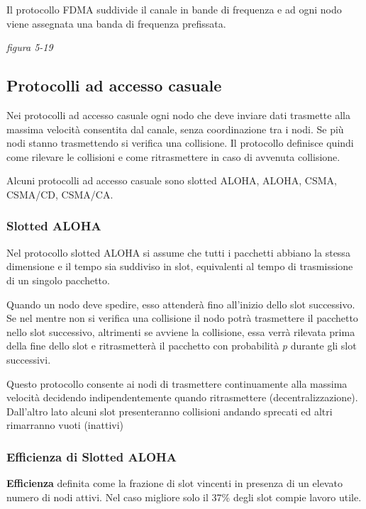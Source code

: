 \documentclass[
]{article}
\begin{document}
Il protocollo FDMA suddivide il canale in bande di frequenza e ad ogni
nodo viene assegnata una banda di frequenza prefissata.

\emph{figura 5-19}

\hypertarget{header-n64}{%
\subsection{Protocolli ad accesso casuale}\label{header-n64}}

Nei protocolli ad accesso casuale ogni nodo che deve inviare dati
trasmette alla massima velocità consentita dal canale, senza
coordinazione tra i nodi. Se più nodi stanno trasmettendo si verifica
una collisione. Il protocollo definisce quindi come rilevare le
collisioni e come ritrasmettere in caso di avvenuta collisione.

Alcuni protocolli ad accesso casuale sono slotted ALOHA, ALOHA, CSMA,
CSMA/CD, CSMA/CA.

\hypertarget{header-n67}{%
\subsubsection{Slotted ALOHA}\label{header-n67}}

Nel protocollo slotted ALOHA si assume che tutti i pacchetti abbiano la
stessa dimensione e il tempo sia suddiviso in slot, equivalenti al tempo
di trasmissione di un singolo pacchetto.

Quando un nodo deve spedire, esso attenderà fino all'inizio dello slot
successivo. Se nel mentre non si verifica una collisione il nodo potrà
trasmettere il pacchetto nello slot successivo, altrimenti se avviene la
collisione, essa verrà rilevata prima della fine dello slot e
ritrasmetterà il pacchetto con probabilità \emph{p} durante gli slot
successivi.

Questo protocollo consente ai nodi di trasmettere continuamente alla
massima velocità decidendo indipendentemente quando ritrasmettere
(decentralizzazione). Dall'altro lato alcuni slot presenteranno
collisioni andando sprecati ed altri rimarranno vuoti (inattivi)

\hypertarget{header-n71}{%
\subsubsection{Efficienza di Slotted ALOHA}\label{header-n71}}

\textbf{Efficienza} definita come la frazione di slot vincenti in
presenza di un elevato numero di nodi attivi. Nel caso migliore solo il
37\% degli slot compie lavoro utile.
\end{document}
